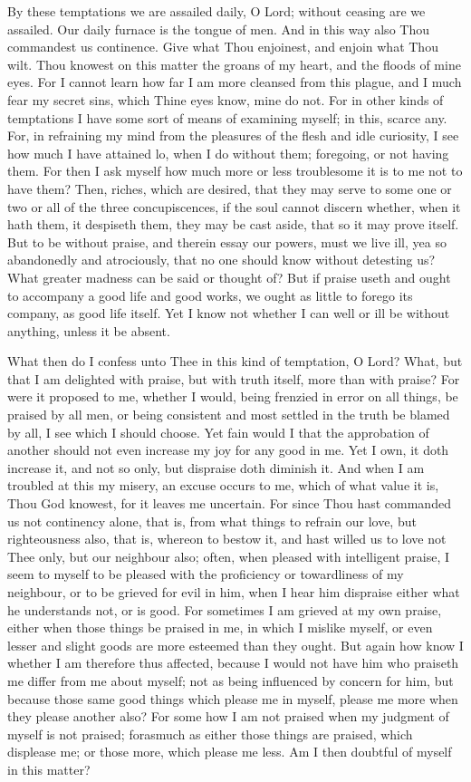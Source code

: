 \documentclass[b5paper,openright,12pt,twoside]{book}
\begin{document}
By these temptations we are assailed daily, O Lord; without ceasing are
we assailed. Our daily furnace is the tongue of men. And in this way
also Thou commandest us continence. Give what Thou enjoinest, and enjoin
what Thou wilt. Thou knowest on this matter the groans of my heart, and
the floods of mine eyes. For I cannot learn how far I am more cleansed
from this plague, and I much fear my secret sins, which Thine eyes know,
mine do not. For in other kinds of temptations I have some sort of means
of examining myself; in this, scarce any. For, in refraining my mind
from the pleasures of the flesh and idle curiosity, I see how much I
have attained lo, when I do without them; foregoing, or not having them.
For then I ask myself how much more or less troublesome it is to me not
to have them? Then, riches, which are desired, that they may serve to
some one or two or all of the three concupiscences, if the soul cannot
discern whether, when it hath them, it despiseth them, they may be
cast aside, that so it may prove itself. But to be without praise,
and therein essay our powers, must we live ill, yea so abandonedly and
atrociously, that no one should know without detesting us? What greater
madness can be said or thought of? But if praise useth and ought to
accompany a good life and good works, we ought as little to forego its
company, as good life itself. Yet I know not whether I can well or ill
be without anything, unless it be absent.

What then do I confess unto Thee in this kind of temptation, O Lord?
What, but that I am delighted with praise, but with truth itself, more
than with praise? For were it proposed to me, whether I would, being
frenzied in error on all things, be praised by all men, or being
consistent and most settled in the truth be blamed by all, I see which
I should choose. Yet fain would I that the approbation of another should
not even increase my joy for any good in me. Yet I own, it doth increase
it, and not so only, but dispraise doth diminish it. And when I am
troubled at this my misery, an excuse occurs to me, which of what value
it is, Thou God knowest, for it leaves me uncertain. For since Thou hast
commanded us not continency alone, that is, from what things to refrain
our love, but righteousness also, that is, whereon to bestow it, and
hast willed us to love not Thee only, but our neighbour also; often,
when pleased with intelligent praise, I seem to myself to be pleased
with the proficiency or towardliness of my neighbour, or to be grieved
for evil in him, when I hear him dispraise either what he understands
not, or is good. For sometimes I am grieved at my own praise, either
when those things be praised in me, in which I mislike myself, or even
lesser and slight goods are more esteemed than they ought. But again how
know I whether I am therefore thus affected, because I would not have
him who praiseth me differ from me about myself; not as being influenced
by concern for him, but because those same good things which please me
in myself, please me more when they please another also? For some how I
am not praised when my judgment of myself is not praised; forasmuch
as either those things are praised, which displease me; or those more,
which please me less. Am I then doubtful of myself in this matter?
\end{document}
